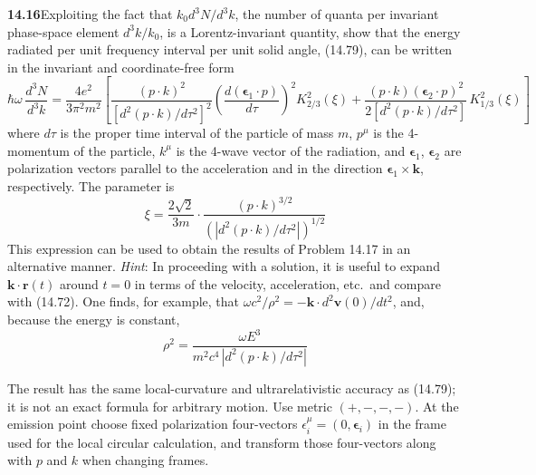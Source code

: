 \par\bigskip
\noindent\textbf{14.16}\quad Exploiting the fact that $k_{0}d^{3}N/d^{3}k$, the number of quanta per invariant phase-space element $d^{3}k/k_{0}$, is a Lorentz-invariant quantity, show that the energy radiated per unit frequency interval per unit solid angle, (14.79), can be written in the invariant and coordinate-free form
\[
\hbar\omega\,\frac{d^{3}N}{d^{3}k}=\frac{4e^{2}}{3\pi^{2}m^{2}}\left[\frac{(p\cdot k)^{2}}{[d^{2}(p\cdot k)/d\tau^{2}]^{2}}\left(\frac{d(\boldsymbol{\epsilon}_{1}\cdot p)}{d\tau}\right)^{2}\!K_{2/3}^{2}(\xi)+\frac{(p\cdot k)(\boldsymbol{\epsilon}_{2}\cdot p)^{2}}{2[d^{2}(p\cdot k)/d\tau^{2}]}\,K_{1/3}^{2}(\xi)\right]
\]
where  $d\tau$ is the proper time interval of the particle of mass $m$, $p^{\mu}$ is the 4-momentum of the particle, $k^{\mu}$ is the 4-wave vector of the radiation, and $\boldsymbol{\epsilon}_{1}$, $\boldsymbol{\epsilon}_{2}$ are polarization vectors parallel to the acceleration and in the direction $\boldsymbol{\epsilon}_{1}\times\mathbf{k}$, respectively. The parameter is
\[
\xi=\frac{2\sqrt{2}}{3m}\cdot\frac{(p\cdot k)^{3/2}}{\left(|d^{2}(p\cdot k)/d\tau^{2}|\right)^{1/2}}
\]
This expression can be used to obtain the results of Problem 14.17 in an alternative manner. \emph{Hint}: In proceeding with a solution, it is useful to expand $\mathbf{k}\cdot\mathbf{r}(t)$ around $t=0$ in terms of the velocity, acceleration, etc.\ and compare with (14.72). One finds, for example, that $\omega c^{2}/\rho^{2}=-\mathbf{k}\cdot d^{2}\mathbf{v}(0)/dt^{2}$, and, because the energy is constant,
\[
\rho^{2}=\frac{\omega E^{3}}{m^{2}c^{4}\,|d^{2}(p\cdot k)/d\tau^{2}|}
\]
\solution

The result has the same local-curvature and ultrarelativistic accuracy
as (14.79); it is not an exact formula for arbitrary motion. Use metric
$(+,-,-,-)$. At the emission point choose fixed polarization four-vectors
$\epsilon_i^\mu=(0,\boldsymbol\epsilon_i)$ in the frame used for the
local circular calculation, and transform those four-vectors along with
$p$ and $k$ when changing frames.


